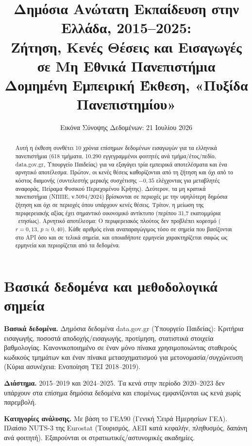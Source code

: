 \documentclass[11pt]{article}
\title{\textbf{Δημόσια Ανώτατη Εκπαίδευση στην Ελλάδα, 2015--2025:\\
Ζήτηση, Κενές Θέσεις και Εισαγωγές σε Μη Εθνικά Πανεπιστήμια}\\[4pt]
\large Δομημένη Εμπειρική Έκθεση, «Πυξίδα Πανεπιστημίου»}
\author{Εικόνα Σύνοψης Δεδομένων: 21 Ιουλίου 2026}
\date{}
\newcommand{\euro}{\texteuro}
\begin{document}
\maketitle

\begin{abstract}
\noindent
Αυτή η έκθεση συνθέτει 10 χρόνια επίσημων δεδομένων εισαγωγών για τα ελληνικά
πανεπιστήμια (618 τμήματα, 10.290 εγγεγραμμένοι φοιτητές ανά τμήμα/έτος/πεδίο,
data.gov.gr, Υπουργείο Παιδείας) για να εξαγάγει τρία εμπειρικά αποτελέσματα και
ένα αρνητικό αποτέλεσμα. Πρώτον, οι κενές θέσεις καθορίζονται από τη ζήτηση και
όχι από το κόστος διαμονής (συντελεστής μερικής συσχέτισης $-0{,}35$ ελέγχοντας
για μεταβλητές αναφοράς, Πείραμα Φυσικού Περιεχομένου Κρήτης). Δεύτερον, τα μη
κρατικά πανεπιστήμια (ΝΠΠΕ, ν.5094/2024) βρίσκονται σε περιοχές με
την υψηλότερη δημόσια ζήτηση και όχι σε περιοχές όπου υπάρχουν κενές θέσεις.
Τρίτον, η μείωση της περιφερειακής αξίας έχει σημαντικό οικονομικό αντίκτυπο
(περίπου 31,7 εκατομμύρια \euro\ ετησίως). Αρνητικό αποτέλεσμα: Ο περιφερειακός
πλούτος δεν προβλέπει κορεσμό ($r=0{,}13$, $p\approx0{,}40$). Κάθε αριθμός είναι
αναπαραγώγιμος τόσο σε σημεία που βασίζονται στο API όσο και σε τελικά σημεία, και
οποιαδήποτε ερμηνεία χαρακτηρίζεται σαφώς ως ερμηνεία και περιορίζεται από τα
δεδομένα.
\end{abstract}

\section{Βασικά δεδομένα και μεθοδολογικά σημεία}

\textbf{Βασικά δεδομένα.} Δημόσια δεδομένα data.gov.gr (Υπουργείο Παιδείας):
Κριτήρια εισαγωγής, ποσοστά αποδοχής/εισαγωγής, προτίμηση, στατιστικά στοιχεία
βαθμολογίας. Κανονικοποιημένο σε έναν μόνο πίνακα χρησιμοποιώντας σταθερούς
κωδικούς τμημάτων και έναν πίνακα μετασχηματισμού για μετονομασία/συγχώνευση
(Κύρια ασυνέχεια: Ενοποίηση ΤΕΙ 2018--2019).

\textbf{Διάστημα.} 2015--2019 και 2024--2025. Τα κενά στην περίοδο 2020--2023 δεν
υπάρχουν στα επίσημα δημόσια δεδομένα και επομένως εμφανίζονται ως κενά χωρίς
παρεμβολή.

\textbf{Κατηγορίες ανάλυσης.} Με βάση το ΓΕΛ90 (Γενική Σειρά Ημερησίων ΓΕΛ).
Πλαίσιο NUTS-3 της Eurostat (Τουρισμός, ΑΕΠ κατά κεφαλήν, πληθυσμός, δαπάνη ανά
φοιτητή). Εξαιρούνται οι στρατιωτικές/αστυνομικές ακαδημίες.
\end{document}
